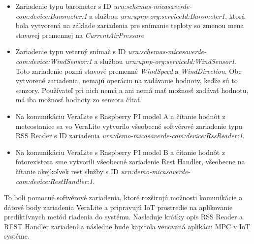\begin{itemize}
  \item Zariadenie typu barometer s ID  \textit{urn:schemas-micasaverde-com:device:Barometer:1} a službou \textit{urn:upnp-org:serviceId:Barometer1}, ktorá bola vytvorená na základe zariadenia pre snímanie teploty so zmenou mena stavovej premennej na \textit{CurrentAirPressure}
  \item Zariadenie typu veterný snímač s ID  \textit{urn:schemas-micasaverde-com:device:WindSensor:1} a službou \textit{urn:upnp-org:serviceId:WindSensor1}. Toto zariadenie pozná stavové premenné \textit{WindSpeed} a \textit{WindDirection}. Obe vytvorené zariadenia, nemajú operáciu na zadávanie hodnoty, keďže sú to senzory. Používateľ pri nich nemá a ani nemá mať možnosť zadávať hodnotu, má iba možnosť hodnoty zo senzora čítať.
  \item  Na komunikáciu VeraLite s Raspberry PI model A a čítanie hodnôt z meteostanice sa vo VeraLite vytvorilo všeobecné softvérové zariadenie typu RSS Reader s ID zariadenia \textit{urn:demo-micasaverde-com:device:RssReader:1}.
  \item Na komunikáciu VeraLite s Raspberry PI model B a čítanie hodnôt z fotorezistora sme vytvorili všeobecné zariadenie Rest Handler, všeobecne na čítanie akejkoľvek rest služby s ID \textit{urn:demo-micasaverde-com:device:RestHandler:1}.
\end{itemize} 
To boli pomocné softvérové zariadenia, ktoré rozširujú možnosti komunikácie a dátové body zariadenia VeraLite a pripravujú IoT prostredie na aplikovanie prediktívnych metód riadenia do systému. Nasleduje krátky opis RSS Reader a REST Handler zariadení a následne bude kapitola venovaná aplikácii MPC v IoT systéme.

